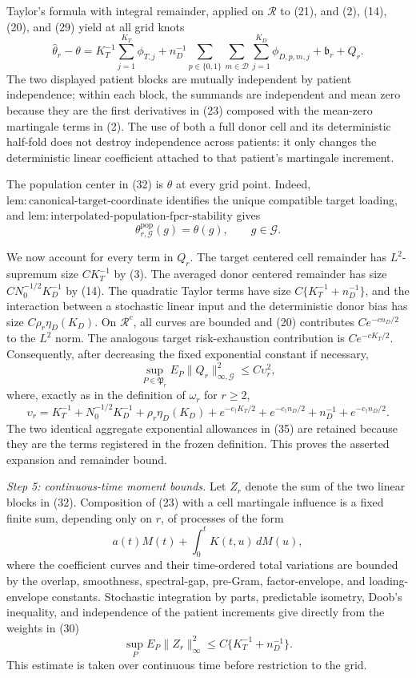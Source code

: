 Taylor's formula with integral remainder, applied on \(\mathcal R\) to (21), and (2), (14), (20), and (29) yield at all grid knots
\[
 \widehat\theta_r-\theta
 =K_T^{-1}\sum_{j=1}^{K_T}\phi_{T,j}
  +n_D^{-1}\sum_{p\in\{0,1\}}
       \sum_{m\in\mathcal D}\sum_{j=1}^{K_D}\phi_{D,p,m,j}
  +\mathfrak b_r+Q_r.
\tag{32}
\]
The two displayed patient blocks are mutually independent by patient independence; within each block, the summands are independent and mean zero because they are the first derivatives in (23) composed with the mean-zero martingale terms in (2).  The use of both a full donor cell and its deterministic half-fold does not destroy independence across patients: it only changes the deterministic linear coefficient attached to that patient's martingale increment.

The population center in (32) is \(\theta\) at every grid point.  Indeed,
\(\mathrm{lem:canonical\mbox{-}target\mbox{-}coordinate}\) identifies the unique compatible target loading, and
\(\mathrm{lem:interpolated\mbox{-}population\mbox{-}fpcr\mbox{-}stability}\) gives
\[
 \theta^{\mathrm{pop}}_{r,\mathcal G}(g)=\theta(g),
 \qquad g\in\mathcal G.
\tag{33}
\]

We now account for every term in \(Q_r\).  The target centered cell remainder has \(L^2\)-supremum size \(CK_T^{-1}\) by (3).  The averaged donor centered remainder has size
\(CN_0^{-1/2}K_D^{-1}\) by (14).  The quadratic Taylor terms have size
\(C\{K_T^{-1}+n_D^{-1}\}\), and the interaction between a stochastic linear input and the deterministic donor bias has size \(C\rho_r\eta_D(K_D)\).  On \(\mathcal R^c\), all curves are bounded and (20) contributes \(Ce^{-cn_D/2}\) to the \(L^2\) norm.  The analogous target risk-exhaustion contribution is \(Ce^{-cK_T/2}\).  Consequently, after decreasing the fixed exponential constant if necessary,
\[
 \sup_{P\in\mathfrak P_r}E_P
 \|Q_r\|_{\infty,\mathcal G}^2
 \le C\upsilon_r^2,
\tag{34}
\]
where, exactly as in the definition of \(\omega_r\) for \(r\ge2\),
\[
 \upsilon_r=
 K_T^{-1}+N_0^{-1/2}K_D^{-1}
 +\rho_r\eta_D(K_D)
 +e^{-c_\dagger K_T/2}+e^{-c_\dagger n_D/2}
 +n_D^{-1}+e^{-c_\dagger n_D/2}.
\tag{35}
\]
The two identical aggregate exponential allowances in (35) are retained because they are the terms registered in the frozen definition.  This proves the asserted expansion and remainder bound.

\emph{Step 5: continuous-time moment bounds.}
Let \(Z_r\) denote the sum of the two linear blocks in (32).  Composition of (23) with a cell martingale influence is a fixed finite sum, depending only on \(r\), of processes of the form
\[
 a(t)M(t)+\int_0^tK(t,u)\,dM(u),
\tag{36}
\]
where the coefficient curves and their time-ordered total variations are bounded by the overlap, smoothness, spectral-gap, pre-Gram, factor-envelope, and loading-envelope constants.  Stochastic integration by parts, predictable isometry, Doob's inequality, and independence of the patient increments give directly from the weights in (30)
\[
 \sup_PE_P\|Z_r\|_\infty^2
 \le C\{K_T^{-1}+n_D^{-1}\}.
\tag{37}
\]
This estimate is taken over continuous time before restriction to the grid.

